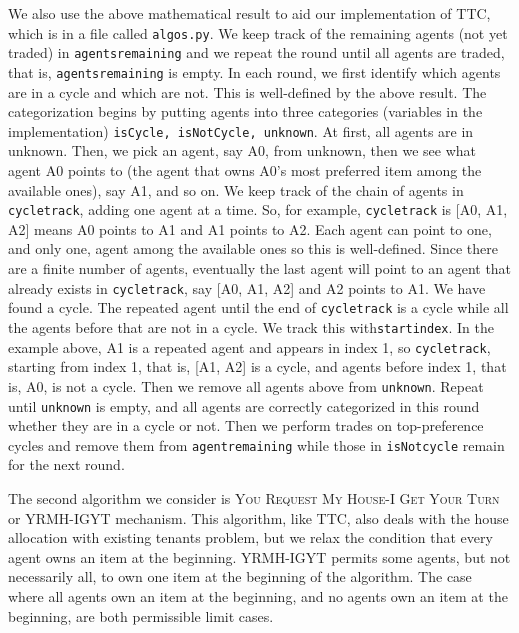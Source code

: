 \documentclass[12pt]{article}
\begin{document}
We also use the above mathematical result to aid our implementation of TTC, which is in a file called \texttt{algos.py}. We keep track of the remaining agents (not yet traded) in \texttt{agents\textunderscore remaining} and we repeat the round until all agents are traded, that is, \texttt{agents\textunderscore remaining} is empty. In each round, we first identify which agents are in a cycle and which are not. This is well-defined by the above result. The categorization begins by putting agents into three categories (variables in the implementation) \texttt{isCycle, isNotCycle, unknown}. At first, all agents are in unknown. Then, we pick an agent, say A0, from unknown, then we see what agent A0 points to (the agent that owns A0's most preferred item among the available ones), say A1, and so on. We keep track of the chain of agents in \texttt{cycle\textunderscore track}, adding one agent at a time. So, for example, \texttt{cycle\textunderscore track} is [A0, A1, A2] means A0 points to A1 and A1 points to A2. Each agent can point to one, and only one, agent among the available ones so this is well-defined. Since there are a finite number of agents, eventually the last agent will point to an agent that already exists in \texttt{cycle\textunderscore track}, say [A0, A1, A2] and A2 points to A1. We have found a cycle. The repeated agent until the end of \texttt{cycle\textunderscore track} is a cycle while all the agents before that are not in a cycle. We track this with\texttt{start\textunderscore index}. In the example above, A1 is  a repeated agent and appears in index 1, so \texttt{cycle\textunderscore track}, starting from index 1, that is, [A1, A2] is a cycle, and agents before index 1, that is, A0, is not a cycle. Then we remove all agents above from \texttt{unknown}. Repeat until \texttt{unknown} is empty, and all agents are correctly categorized in this round whether they are in a cycle or not. Then we perform trades on top-preference cycles and remove them from \texttt{agent\textunderscore remaining} while those in \texttt{isNotcycle} remain for the next round.

The second algorithm we consider is \textsc{You Request My House-I Get Your Turn} or \textsc{YRMH-IGYT} mechanism. This algorithm, like TTC, also deals with the house allocation with existing tenants problem, but we relax the condition that every agent owns an item at the beginning. YRMH-IGYT permits some agents, but not necessarily all, to own one item at the beginning of the algorithm. The case where all agents own an item at the beginning, and no agents own an item at the beginning, are both permissible limit cases.
\end{document}
